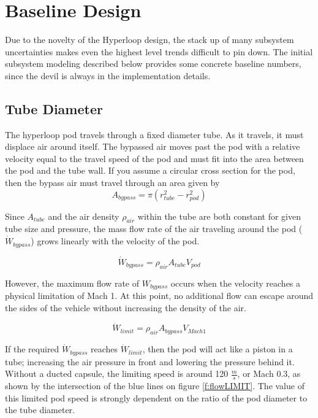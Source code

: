 \documentclass[heading.tex]{subfiles}
\begin{document}
\section{Baseline Design}

Due to the novelty of the Hyperloop design, the stack up of many subsystem uncertainties makes even the highest level trends difficult to pin down.
The initial subsystem modeling described below provides some concrete baseline numbers, since the devil is always in the implementation details. 

\subsection{Tube Diameter}
The hyperloop pod travels through a fixed diameter tube. As it travels, it must displace air around itself. The bypassed air moves past the
pod with a relative velocity equal to the travel speed of the pod and must fit into the area between the pod and the tube wall. If you
assume a circular cross section for the pod, then the bypass air must travel through an area given by
\begin{equation*}
A_{bypass} = \pi(r_{tube}^2-r_{pod}^2)
\end{equation*}

Since $A_{tube}$ and the air density $\rho_{air}$ within the tube are both constant for given tube size and pressure, the mass flow rate of the air
traveling around the pod ($\dot{W}_{bypass}$) grows linearly with the velocity of the pod.

\begin{equation*}
\dot{W}_{bypass} = \rho_{air} A_{tube} V_{pod}
\end{equation*}

However, the maximum flow rate of ${W}_{bypass}$ occurs when the velocity reaches a physical limitation of Mach 1. At this point, no additional
flow can escape around the sides of the vehicle without increasing the density of the air.

\begin{equation*}
\dot{W}_{limit} = \rho_{air} A_{bypass} V_{Mach 1}
\end{equation*}

If the required $\dot{W}_{bypass}$ reaches $\dot{W}_{limit}$, then the pod will act like a piston in a tube; increasing the air pressure in front
and lowering the pressure behind it. Without a ducted capsule, the limiting speed is around 120 $\frac{m}{s}$, or Mach 0.3, as shown by the intersection of the
blue lines on figure \ref{f:flowLIMIT}. The value of this limited pod speed is strongly dependent on the ratio of the pod diameter to the tube diameter.
\end{document}
